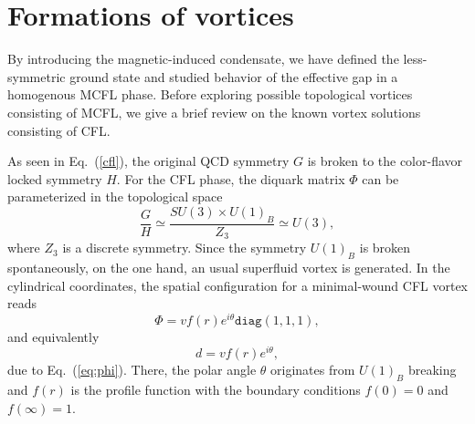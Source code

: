 \documentclass[12pt]{article}
\begin{document}
\section{\bf Formations of vortices}
\label{sec:3}
\vspace{0.2cm}

By introducing the magnetic-induced condensate, we have defined the less-symmetric ground state and
studied behavior of the effective gap in a homogenous MCFL phase. Before exploring possible topological
vortices consisting of MCFL, we give a brief review on the known vortex solutions consisting of CFL.

As seen in Eq.~(\ref{cfl}), the original QCD symmetry $G$ is broken to
the color-flavor locked symmetry $H$.
For the CFL phase, the diquark matrix $\Phi$ can be parameterized in the
topological space
\begin{equation}
  \label{eq:cflvortexgroup}
  \frac{G}{H} \simeq \frac{SU(3) \times U(1)_B}{Z_3}  \simeq U(3),
\end{equation}
where $Z_3$ is a discrete symmetry.
Since the symmetry $U(1)_B$ is broken spontaneously, on the one hand, an usual superfluid vortex is generated.
In the cylindrical coordinates, the spatial configuration for a minimal-wound CFL vortex reads
\begin{equation}
  \label{eq:bvortexphi}
\Phi =vf(r)e^{i \theta} \texttt{diag}(1,1,1),
\end{equation}
and equivalently
\begin{equation}
 d = vf(r)e^{i\theta}, \label{eq:bvortex}\end{equation}
due to Eq.~(\ref{eq:phi}). There, the polar angle $\theta$ originates from $U(1)_B$ breaking and
$f(r)$ is the profile function with the boundary
conditions $f(0) = 0$ and $f(\infty) =1$.
\end{document}
